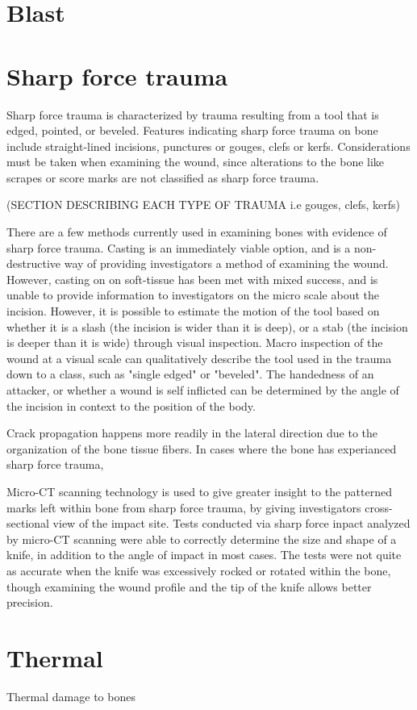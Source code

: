 \documentclass[titlepage]{article}
\begin{document}
\newpage
\section{Blast}


\newpage
\section{Sharp force trauma}
Sharp force trauma is characterized by trauma resulting from a tool that is edged, pointed, or beveled. Features indicating sharp force trauma on bone include straight-lined incisions, punctures or gouges, clefs or kerfs. Considerations must be taken when examining the wound, since alterations to the bone like scrapes or score marks are not classified as sharp force trauma. \cite{trauma}



(SECTION DESCRIBING EACH TYPE OF TRAUMA i.e gouges, clefs, kerfs)

There are a few methods currently used in examining bones with evidence of sharp force trauma. Casting is an immediately viable option, and is a non-destructive way of providing investigators a method of examining the wound. However, casting on on soft-tissue has been met with mixed success, and is unable to provide information to investigators on the micro scale about the incision. However, it is possible to estimate the motion of the tool based on whether it is a slash (the incision is wider than it is deep), or a stab (the incision is deeper than it is wide) through visual inspection. \cite{serrated} Macro inspection of the wound at a visual scale can qualitatively describe the tool used in the trauma down to a class, such as "single edged" or "beveled". The handedness of an attacker, or whether a wound is self inflicted can be determined by the angle of the incision in context to the position of the body.

Crack propagation happens more readily in the lateral direction due to the organization of the bone tissue fibers.\cite{mechanics} In cases where the bone has experianced sharp force trauma,



Micro-CT scanning technology is used to give greater insight to the patterned marks left within bone from sharp force trauma, by giving investigators cross-sectional view of the impact site. Tests conducted via sharp force inpact analyzed by micro-CT scanning were able to correctly determine the size and shape of a knife, in addition to the angle of impact in most cases. The tests were not quite as accurate when the knife was excessively rocked or rotated within the bone, though examining the wound profile and the tip of the knife allows better precision.\cite{micro-ct}


\newpage
\section{Thermal}
Thermal damage to bones

\newpage

\end{document}
